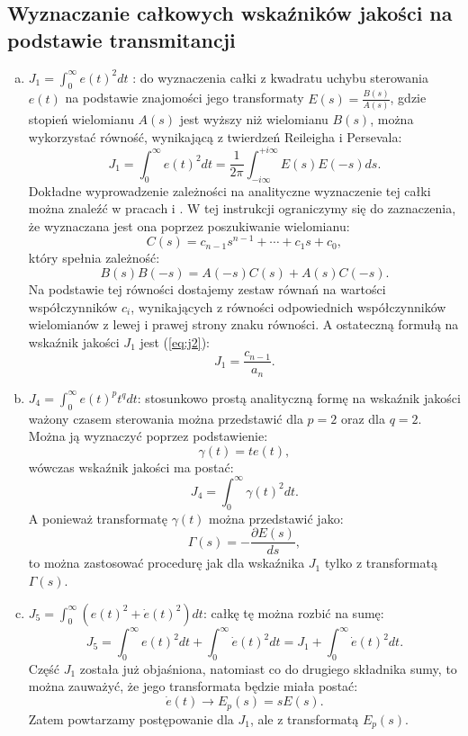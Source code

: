 \documentclass{article}
\begin{document}
    \subsection{Wyznaczanie całkowych wskaźników jakości na podstawie transmitancji}
    \begin{enumerate}[(a)]
        \item $J_{1} = \int_{0}^{\infty}{e(t)^{2}dt}$ : do wyznaczenia całki z kwadratu uchybu sterowania $e(t)$ na podstawie znajomości jego transformaty $E(s) = \frac{B(s)}{A(s)}$, gdzie stopień wielomianu $A(s)$ jest wyższy niż wielomianu $B(s)$, można wykorzystać równość, wynikającą z twierdzeń Reileigha i Persevala:
        $$
            J_{1}
            =
            \int_{0}^{\infty}{e(t)^{2}dt}
            =
            \frac{1}{2\pi}\int_{-i\infty}^{+i\infty}{E(s)E(-s)ds}.
        $$
        Dokładne wyprowadzenie zależności na analityczne wyznaczenie tej całki można znaleźć w pracach \cite{Mitkowski2007} i \cite{Gorecki1993}.
        W tej instrukcji ograniczymy się do zaznaczenia, że wyznaczana jest ona poprzez poszukiwanie wielomianu:
        $$
            C(s) = c_{n-1}s^{n-1} + \cdots + c_{1}s + c_{0},
        $$
        który spełnia zależność:
        $$
            B(s)B(-s) = A(-s)C(s) + A(s)C(-s).
        $$
        Na podstawie tej równości dostajemy zestaw równań na wartości współczynników $c_i$, wynikających z równości odpowiednich współczynników wielomianów z lewej i prawej strony znaku równości.
        A ostateczną formułą na wskaźnik jakości $J_{1}$ jest (\ref{eq:j2}):
        \begin{equation}
        \label{eq:j2}
            J_{1} = \frac{c_{n-1}}{a_{n}}.
        \end{equation}

        \item $J_{4} = \int_{0}^{\infty}{e(t)^{p}t^{q}dt}$: stosunkowo prostą analityczną formę na wskaźnik jakości ważony czasem sterowania można przedstawić dla $p =2$ oraz dla $q = 2$.
        Można ją wyznaczyć poprzez podstawienie:
        $$
            \gamma(t) = te(t),
        $$
        wówczas wskaźnik jakości ma postać:
        $$
            J_{4} = \int_{0}^{\infty}{\gamma(t)^{2}dt}.
        $$
        A ponieważ transformatę $\gamma(t)$ można przedstawić jako:
        $$
            \Gamma(s) = -\frac{\partial E(s)}{ds},
        $$
        to można zastosować procedurę jak dla wskaźnika $J_{1}$ tylko z transformatą $\Gamma(s)$.

        \item $J_{5} = \int_{0}^{\infty}{\left(e(t)^{2} + \dot{e}(t)^{2}\right)dt}$: całkę tę można rozbić na sumę:
        $$
            J_{5} = \int_{0}^{\infty}{e(t)^{2}dt}  + \int_{0}^{\infty}{\dot{e}(t)^{2}dt} = J_{1} + \int_{0}^{\infty}{\dot{e}(t)^{2}dt}.
        $$
        Część $J_{1}$ została już objaśniona, natomiast co do drugiego składnika sumy, to można zauważyć, że jego transformata będzie miała postać:
        $$
            \dot{e}(t) \rightarrow E_{p}(s) = sE(s).
        $$
        Zatem powtarzamy postępowanie dla $J_{1}$, ale z transformatą
        $E_{p}(s)$.
        

\end{enumerate}
\end{document}
